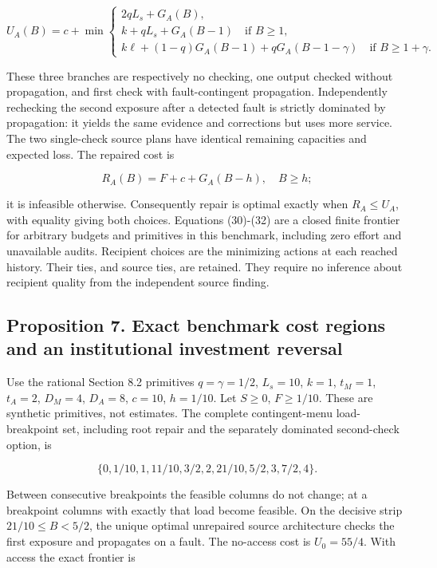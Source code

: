 \documentclass[
  11pt,
  a4paper,
]{article}
\begin{document}
\[U_A(B)=c+\min\left\{\begin{array}{l}
2qL_s+G_A(B),\\
k+qL_s+G_A(B-1)\quad\text{if }B\geq1,\\
k\ell+(1-q)G_A(B-1)+qG_A(B-1-\gamma)
\quad\text{if }B\geq1+\gamma.
\end{array}\right. \tag{31}\]

These three branches are respectively no checking, one output checked
without propagation, and first check with fault-contingent propagation.
Independently rechecking the second exposure after a detected fault is
strictly dominated by propagation: it yields the same evidence and
corrections but uses more service. The two single-check source plans
have identical remaining capacities and expected loss. The repaired cost
is

\[R_A(B)=F+c+G_A(B-h),\quad B\geq h; \tag{32}\]

it is infeasible otherwise. Consequently repair is optimal exactly when
\(R_A\leq U_A\), with equality giving both choices. Equations (30)-(32)
are a closed finite frontier for arbitrary budgets and primitives in
this benchmark, including zero effort and unavailable audits. Recipient
choices are the minimizing actions at each reached history. Their ties,
and source ties, are retained. They require no inference about recipient
quality from the independent source finding.

\hypertarget{proposition-7.-exact-benchmark-cost-regions-and-an-institutional-investment-reversal}{%
\subsection{Proposition 7. Exact benchmark cost regions and an
institutional investment
reversal}\label{proposition-7.-exact-benchmark-cost-regions-and-an-institutional-investment-reversal}}

Use the rational Section 8.2 primitives \(q=\gamma=1/2\), \(L_s=10\),
\(k=1\), \(t_M=1\), \(t_A=2\), \(D_M=4\), \(D_A=8\), \(c=10\),
\(h=1/10\). Let \(S\geq0\), \(F\geq1/10\). These are synthetic
primitives, not estimates. The complete contingent-menu load-breakpoint
set, including root repair and the separately dominated second-check
option, is

\[\{0,1/10,1,11/10,3/2,2,21/10,5/2,3,7/2,4\}. \tag{33}\]

Between consecutive breakpoints the feasible columns do not change; at a
breakpoint columns with exactly that load become feasible. On the
decisive strip \(21/10\leq B<5/2\), the unique optimal unrepaired source
architecture checks the first exposure and propagates on a fault. The
no-access cost is \(U_0=55/4\). With access the exact frontier is
\end{document}
